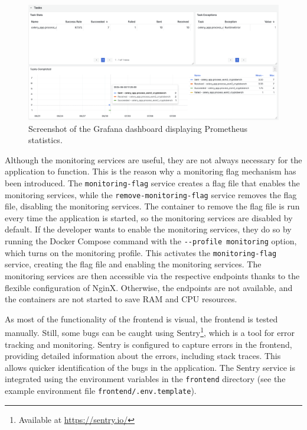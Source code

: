 \begin{figure}[htpb]
    \centering
    \includegraphics[width=\textwidth]{img/grafana.png}
    \caption{Screenshot of the Grafana dashboard displaying Prometheus statistics.}
    \label{fig:grafana}
\end{figure}

Although the monitoring services are useful, they are not always necessary for the application to function. This is the reason why a monitoring flag mechanism has been introduced. The \lstinline!monitoring-flag! service creates a flag file that enables the monitoring services, while the \lstinline!remove-monitoring-flag! service removes the flag file, disabling the monitoring services. The container to remove the flag file is run every time the application is started, so the monitoring services are disabled by default. If the developer wants to enable the monitoring services, they do so by running the Docker Compose command with the \lstinline|--profile monitoring| option, which turns on the monitoring profile. This activates the \lstinline!monitoring-flag! service, creating the flag file and enabling the monitoring services. The monitoring services are then accessible via the respective endpoints thanks to the flexible configuration of NginX. Otherwise, the endpoints are not available, and the containers are not started to save RAM and CPU resources.

As most of the functionality of the frontend is visual, the frontend is tested manually. Still, some bugs can be caught using Sentry\footnote{Available at \url{https://sentry.io/}}, which is a tool for error tracking and monitoring. Sentry is configured to capture errors in the frontend, providing detailed information about the errors, including stack traces. This allows quicker identification of the bugs in the application. The Sentry service is integrated using the environment variables in the \lstinline|frontend| directory (see the example environment file \lstinline!frontend/.env.template!).


